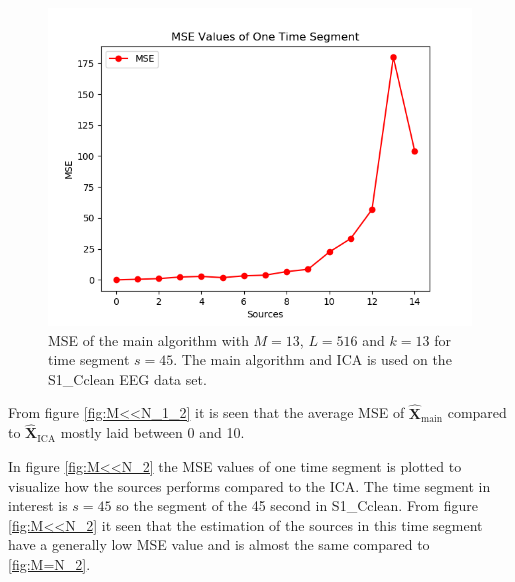 \begin{figure}[H]
\centering
\includegraphics[scale=0.5]{figures/ch_7/MSE_2M_N.png}
\caption{MSE of the main algorithm with $M=13$, $L = 516$ and $k=13$ for time segment $s=45$. The main algorithm and ICA is used on the S1\_Cclean EEG data set.}
	\label{fig:M<<N_2}
\label{fig:M<N_2}
\end{figure}
\noindent
From figure \ref{fig:M<<N_1_2} it is seen that the average MSE of $\hat{\mathbf{X}}_{\text{main}}$ compared to $\hat{\mathbf{X}}_{\text{ICA}}$ mostly laid between 0 and 10. 

In figure \ref{fig:M<<N_2} the MSE values of one time segment is plotted to visualize how the sources performs compared to the ICA. The time segment in interest is $s = 45$ so the segment of the 45 second in S1\_Cclean. 
From figure \ref{fig:M<<N_2} it seen that the estimation of the sources in this time segment have a generally low MSE value and is almost the same compared to \ref{fig:M=N_2}. 

